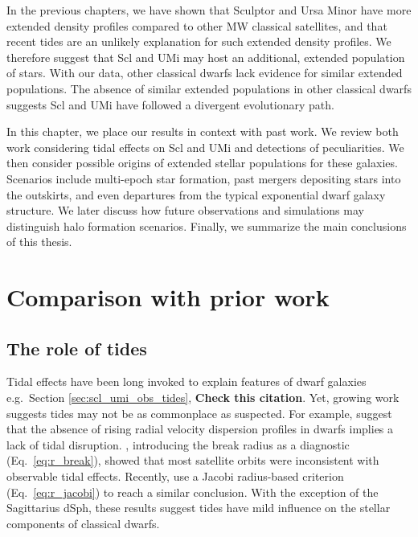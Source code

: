 In the previous chapters, we have shown that Sculptor and Ursa Minor
have more extended density profiles compared to other MW classical
satellites, and that recent tides are an unlikely explanation for such
extended density profiles. We therefore suggest that Scl and UMi may
host an additional, extended population of stars. With our data, other
classical dwarfs lack evidence for similar extended populations. The
absence of similar extended populations in other classical dwarfs
suggests Scl and UMi have followed a divergent evolutionary path.

In this chapter, we place our results in context with past work. We
review both work considering tidal effects on Scl and UMi and detections
of peculiarities. We then consider possible origins of extended stellar
populations for these galaxies. Scenarios include multi-epoch star
formation, past mergers depositing stars into the outskirts, and even
departures from the typical exponential dwarf galaxy structure. We later
discuss how future observations and simulations may distinguish halo
formation scenarios. Finally, we summarize the main conclusions of this
thesis.

\section{Comparison with prior work}\label{comparison-with-prior-work}

\subsection{The role of tides}\label{the-role-of-tides}

Tidal effects have been long invoked to explain features of dwarf
galaxies e.g.~Section \ref{sec:scl_umi_obs_tides},
\citep{mayer+2001a, tsujimoto+shigeyama2002} \textbf{Check this
citation}. Yet, growing work suggests tides may not be as commonplace as
suspected. For example, \citet{read+2006} suggest that the absence of
rising radial velocity dispersion profiles in dwarfs implies a lack of
tidal disruption. \citet{penarrubia+2009}, introducing the break radius
as a diagnostic (Eq.~\ref{eq:r_break}), showed that most satellite
orbits were inconsistent with observable tidal effects. Recently,
\citet{pace+erkal+li2022} use a Jacobi radius-based criterion
(Eq.~\ref{eq:r_jacobi}) to reach a similar conclusion. With the
exception of the Sagittarius dSph, these results suggest tides have mild
influence on the stellar components of classical dwarfs.

